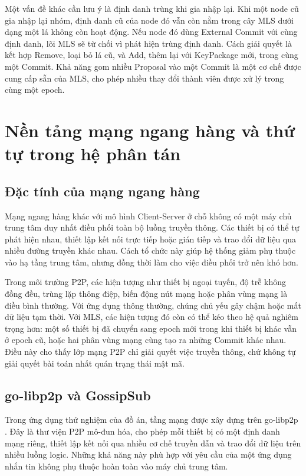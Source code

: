 \documentclass[../DoAn.tex]{subfiles}
\begin{document}
Một vấn đề khác cần lưu ý là định danh trùng khi gia nhập lại. Khi một node cũ gia nhập lại nhóm, định danh cũ của node đó vẫn còn nằm trong cây MLS dưới dạng một lá không còn hoạt động. Nếu node đó dùng External Commit với cùng định danh, lõi MLS sẽ từ chối vì phát hiện trùng định danh. Cách giải quyết là kết hợp Remove, loại bỏ lá cũ, và Add, thêm lại với KeyPackage mới, trong cùng một Commit. Khả năng gom nhiều Proposal vào một Commit là một cơ chế được cung cấp sẵn của MLS, cho phép nhiều thay đổi thành viên được xử lý trong cùng một epoch.

\section{Nền tảng mạng ngang hàng và thứ tự trong hệ phân tán}
\label{sec:mang-ngang-hang-libp2p}

\subsection{Đặc tính của mạng ngang hàng}

Mạng ngang hàng khác với mô hình Client-Server ở chỗ không có một máy chủ trung tâm duy nhất điều phối toàn bộ luồng truyền thông. Các thiết bị có thể tự phát hiện nhau, thiết lập kết nối trực tiếp hoặc gián tiếp và trao đổi dữ liệu qua nhiều đường truyền khác nhau. Cách tổ chức này giúp hệ thống giảm phụ thuộc vào hạ tầng trung tâm, nhưng đồng thời làm cho việc điều phối trở nên khó hơn.

Trong môi trường P2P, các hiện tượng như thiết bị ngoại tuyến, độ trễ không đồng đều, trùng lặp thông điệp, biến động nút mạng hoặc phân vùng mạng là điều bình thường. Với ứng dụng thông thường, chúng chủ yếu gây chậm hoặc mất dữ liệu tạm thời. Với MLS, các hiện tượng đó còn có thể kéo theo hệ quả nghiêm trọng hơn: một số thiết bị đã chuyển sang epoch mới trong khi thiết bị khác vẫn ở epoch cũ, hoặc hai phân vùng mạng cùng tạo ra những Commit khác nhau. Điều này cho thấy lớp mạng P2P chỉ giải quyết việc truyền thông, chứ không tự giải quyết bài toán nhất quán trạng thái mật mã.

\subsection{go-libp2p và GossipSub}

Trong ứng dụng thử nghiệm của đồ án, tầng mạng được xây dựng trên go-libp2p \cite{libp2p2026doc}. Đây là thư viện P2P mô-đun hóa, cho phép mỗi thiết bị có một định danh mạng riêng, thiết lập kết nối qua nhiều cơ chế truyền dẫn và trao đổi dữ liệu trên nhiều luồng logic. Những khả năng này phù hợp với yêu cầu của một ứng dụng nhắn tin không phụ thuộc hoàn toàn vào máy chủ trung tâm.
\end{document}
